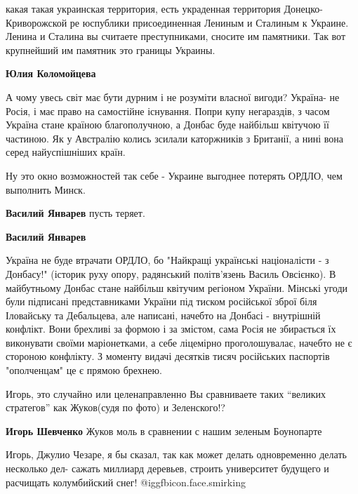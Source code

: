 \begin{itemize}
\begin{itemize}
какая такая украинская территория, есть украденная территория
Донецко-Криворожской ре юспублики присоединенная Лениным и Сталиным к Украине.
Ленина и Сталина вы считаете преступниками, сносите им памятники. Так вот
крупнейший им памятник это границы Украины.

\textbf{Юлия Коломойцева} 

А чому увесь світ має бути дурним і не розуміти власної вигоди? Україна- не
Росія, і має право на самостійне існування. Попри купу негараздів, з часом
Україна стане країною благополучною, а Донбас буде найбільш квітучою її
частиною. Як у Австралію колись зсилали каторжників з Британії, а нині вона
серед найуспішніших країн.

\end{itemize} %


Ну это окно возможностей так себе - Украине выгоднее потерять ОРДЛО, чем
выполнить Минск.

\begin{itemize} %
\textbf{Василий Январев} пусть теряет.

\textbf{Василий Январев} 

Україна не буде втрачати ОРДЛО, бо "Найкращі українські націоналісти - з
Донбасу!" (історик руху опору, радянський політв'язень Василь Овсієнко). В
майбутньому Донбас стане найбільш квітучим регіоном України. Мінські угоди були
підписані представниками України під тиском російської зброї біля Іловайську та
Дебальцева, але написані, начебто на Донбасі - внутрішній конфлікт. Вони
брехливі за формою і за змістом, сама Росія не збирається їх виконувати своїми
маріонетками, а себе ліцемірно проголошувалає, начебто не є стороною конфлікту.
З моменту видачі десятків тисяч російських паспортів "ополченцам" це є прямою
брехнею.

\end{itemize} %

Игорь, это случайно или целенаправленно Вы сравниваете таких \enquote{великих
стратегов} как Жуков(судя по фото) и Зеленского!?

\begin{itemize} %
\textbf{Игорь Шевченко} Жуков моль в сравнении с нашим зеленым Боунопарте

Игорь, Джулио Чезаре, я бы сказал, так как может делать одновременно делать несколько дел- сажать миллиард деревьев, строить университет будущего и расчищать колумбийский снег! @igg{fbicon.face.smirking} 
\end{itemize} %


\end{itemize}
